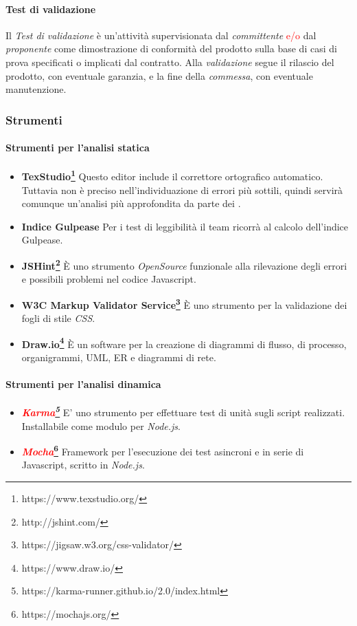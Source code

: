 	\paragraph{\textbf{Test di validazione}}
	Il \emph{Test di validazione} è un'attività supervisionata dal \emph{committente} 
	\textcolor{red}{e/o} dal \emph{proponente} come dimostrazione di conformità del prodotto sulla base 
	di casi di prova specificati o implicati dal contratto.
	Alla \emph{validazione} segue il rilascio del prodotto, con eventuale garanzia, e la fine della
	\emph{commessa},	con eventuale manutenzione.

\subsubsection{Strumenti}
\paragraph{Strumenti per l'analisi statica}
\begin{itemize}
	\item \textbf{TexStudio\footnote{https://www.texstudio.org/}}
	Questo editor include il correttore ortografico automatico. Tuttavia non è preciso nell'individuazione di errori più sottili, quindi servirà comunque un'analisi più approfondita da parte dei \vers.
	\item \textbf{Indice Gulpease}
	Per i test di leggibilità il team ricorrà al calcolo dell'indice Gulpease.
	\item \textbf{JSHint\footnote{http://jshint.com/}}
	È uno strumento \emph{OpenSource} funzionale alla rilevazione degli errori e possibili problemi nel codice Javascript.
	\item \textbf{W3C Markup Validator Service\footnote{https://jigsaw.w3.org/css-validator/}}
	È uno strumento per la validazione dei fogli di stile \emph{CSS}.
	\item \textbf{Draw.io\footnote{https://www.draw.io/}}
	È un software per la creazione di diagrammi di flusso, di processo, organigrammi, UML, ER e diagrammi di rete.
\end{itemize}
\paragraph{Strumenti per l'analisi dinamica}
\begin{itemize}
	\item \textbf{\emph{\textcolor{red}{Karma}\footnote{https://karma-runner.github.io/2.0/index.html}}}
	E' uno strumento per effettuare test di unità sugli script realizzati. Installabile come modulo per \emph{Node.js}.
	\item \textbf{\emph{\textcolor{red}{Mocha}}\footnote{https://mochajs.org/}}
	Framework per l'esecuzione dei test asincroni e in serie di Javascript, scritto in \emph{Node.js}.
\end{itemize}

